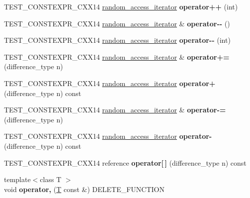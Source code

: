 \begin{DoxyCompactItemize}
T\+E\+S\+T\+\_\+\+C\+O\+N\+S\+T\+E\+X\+P\+R\+\_\+\+C\+X\+X14 \mbox{\hyperlink{classrandom__access__iterator}{random\+\_\+access\+\_\+iterator}} {\bfseries operator++} (int)
\item 
\mbox{\label{classrandom__access__iterator_aa2fe0e4e83a659d953a4b6cd90e1fbf8}} 
T\+E\+S\+T\+\_\+\+C\+O\+N\+S\+T\+E\+X\+P\+R\+\_\+\+C\+X\+X14 \mbox{\hyperlink{classrandom__access__iterator}{random\+\_\+access\+\_\+iterator}} \& {\bfseries operator-\/-\/} ()
\item 
\mbox{\label{classrandom__access__iterator_a3dc450a5947577ee6d8a7f40f59a78c6}} 
T\+E\+S\+T\+\_\+\+C\+O\+N\+S\+T\+E\+X\+P\+R\+\_\+\+C\+X\+X14 \mbox{\hyperlink{classrandom__access__iterator}{random\+\_\+access\+\_\+iterator}} {\bfseries operator-\/-\/} (int)
\item 
\mbox{\label{classrandom__access__iterator_aa91778b20773ed16d99c2dff12925778}} 
T\+E\+S\+T\+\_\+\+C\+O\+N\+S\+T\+E\+X\+P\+R\+\_\+\+C\+X\+X14 \mbox{\hyperlink{classrandom__access__iterator}{random\+\_\+access\+\_\+iterator}} \& {\bfseries operator+=} (difference\+\_\+type n)
\item 
\mbox{\label{classrandom__access__iterator_ab01fd3c278c40a3fdac8931d807255dc}} 
T\+E\+S\+T\+\_\+\+C\+O\+N\+S\+T\+E\+X\+P\+R\+\_\+\+C\+X\+X14 \mbox{\hyperlink{classrandom__access__iterator}{random\+\_\+access\+\_\+iterator}} {\bfseries operator+} (difference\+\_\+type n) const
\item 
\mbox{\label{classrandom__access__iterator_a069d7ce7f817f59935360b602b28972a}} 
T\+E\+S\+T\+\_\+\+C\+O\+N\+S\+T\+E\+X\+P\+R\+\_\+\+C\+X\+X14 \mbox{\hyperlink{classrandom__access__iterator}{random\+\_\+access\+\_\+iterator}} \& {\bfseries operator-\/=} (difference\+\_\+type n)
\item 
\mbox{\label{classrandom__access__iterator_a78e4602b3082f22fd28550c9b941f541}} 
T\+E\+S\+T\+\_\+\+C\+O\+N\+S\+T\+E\+X\+P\+R\+\_\+\+C\+X\+X14 \mbox{\hyperlink{classrandom__access__iterator}{random\+\_\+access\+\_\+iterator}} {\bfseries operator-\/} (difference\+\_\+type n) const
\item 
\mbox{\label{classrandom__access__iterator_afde25e5cc23e3cdd69ab7757ccf56c00}} 
T\+E\+S\+T\+\_\+\+C\+O\+N\+S\+T\+E\+X\+P\+R\+\_\+\+C\+X\+X14 reference {\bfseries operator\mbox{[}$\,$\mbox{]}} (difference\+\_\+type n) const
\item 
\mbox{\label{classrandom__access__iterator_a2e5152e3b9393770ddcf10df6fa3825f}} 
{\footnotesize template$<$class T $>$ }\\void {\bfseries operator,} (\mbox{\hyperlink{struct_t}{T}} const \&) D\+E\+L\+E\+T\+E\+\_\+\+F\+U\+N\+C\+T\+I\+ON
\end{DoxyCompactItemize}
